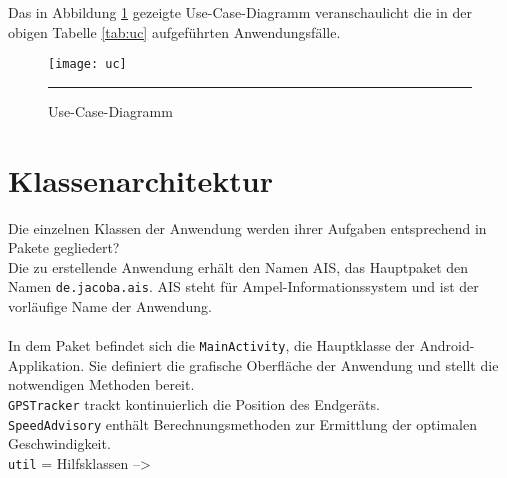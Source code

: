 Das in Abbildung \ref{fig:uc} gezeigte Use-Case-Diagramm veranschaulicht die in der obigen Tabelle \ref{tab:uc} aufgeführten Anwendungsfälle.  
\begin{figure}[H]  
    \centering  
    \texttt{[image: uc]} 
    \rule{35em}{0.5pt}
    \caption{Use-Case-Diagramm}
    \label{fig:uc}
\end{figure}
\section{Klassenarchitektur}
Die einzelnen Klassen der Anwendung werden ihrer Aufgaben entsprechend in Pakete gegliedert?\\
Die zu erstellende Anwendung erhält den Namen AIS, das Hauptpaket den Namen \texttt{de.jacoba.ais}. AIS steht für Ampel-Informationssystem und ist der vorläufige Name der Anwendung. \\\\
In dem Paket befindet sich die \texttt{MainActivity}, die Hauptklasse der Android-Applikation. Sie definiert die grafische Oberfläche der Anwendung und stellt die notwendigen Methoden bereit. \\
\texttt{GPSTracker} trackt kontinuierlich die Position des Endgeräts.\\
\texttt{SpeedAdvisory} enthält Berechnungsmethoden zur Ermittlung der optimalen Geschwindigkeit.\\
 \texttt{util} = Hilfsklassen -->
